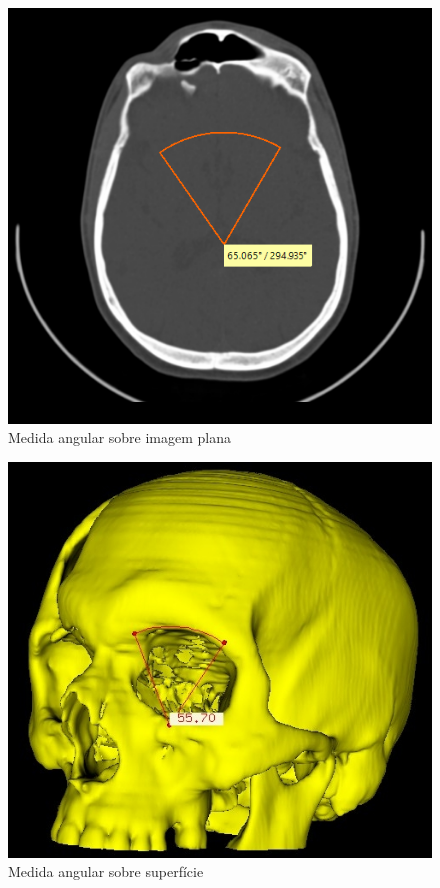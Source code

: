 \begin{figure}[!htb]
\centering
\includegraphics[scale=0.38]{../user_guide_figures/invesalius_screen/axial_angular.png}
\caption{Medida angular sobre imagem plana}
\label{fig:axial_angular}
\end{figure}

\begin{figure}[!htb]
\centering
\includegraphics[scale=0.33]{../user_guide_figures/invesalius_screen/angular_superficie.jpg}
\caption{Medida angular sobre superfície}
\label{fig:axial_superficie}
\end{figure}

